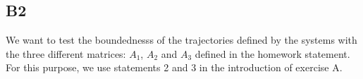 \documentclass[11pt]{article}
\begin{document}
\begin{comment}
Solve \ref{C22} for $Z_{22} \in R^{n_{k}xn_{k}}$ using \ref{Y22} or \ref{vecY22} \\
Compute $C_{12}^{\sim}, C_{21}^{\sim}$ using \ref{C12sim} and \ref{C21sim} \\
Solve \ref{C12sim} and \ref{C21sim} for $Z_{12} \in R^{mxn_{k}}$ and $Z_{21} \in R^{n_{k}xm}$ using the lemme \ref{lemme} and \ref{vecpj} with p=j \\
Store Y(1:m,m+(1:$n_{k}$))=$Z_{12}$ \\
Store Y(m(1:$n_{k}$), 1:m) = $Z_{21}$ \\
Store Y(m+(1:$n_{k}$), m+(1:$n_{k}$))=$Z_{22}$ \\
Set $C = C_{11} - R_{12} Z_{21} - Z_{12} R_{12}^{T}$}\\
end
\Return{solution $P = U Y U^{*}$}
\caption{ }
\end{algorithm}
\end{comment}


\subsection*{B2}
We want to test the boundednesss of the trajectories defined by the systems with the three different matrices: $A_1$, $A_2$ and $A_3$ defined in the homework statement. For this purpose, we use statements 2 and 3 in the introduction of exercise A.
\end{document}
